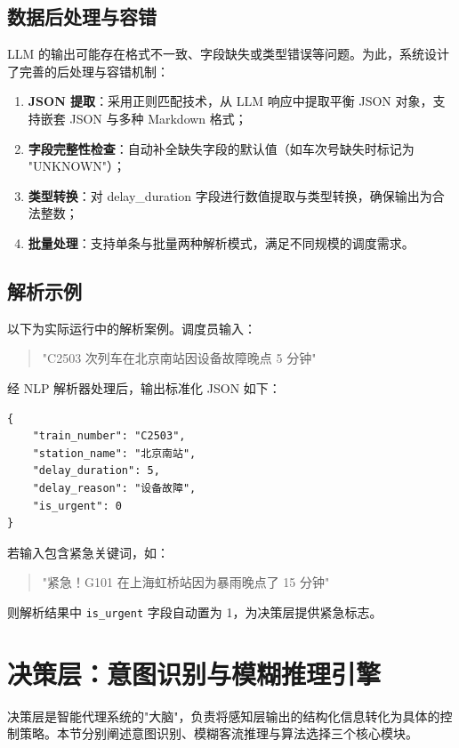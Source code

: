 \subsection{数据后处理与容错}

LLM 的输出可能存在格式不一致、字段缺失或类型错误等问题。为此，系统设计了完善的后处理与容错机制：

\begin{enumerate}
    \item \textbf{JSON 提取}：采用正则匹配技术，从 LLM 响应中提取平衡 JSON 对象，支持嵌套 JSON 与多种 Markdown 格式；
    \item \textbf{字段完整性检查}：自动补全缺失字段的默认值（如车次号缺失时标记为 "UNKNOWN"）；
    \item \textbf{类型转换}：对 delay\_duration 字段进行数值提取与类型转换，确保输出为合法整数；
    \item \textbf{批量处理}：支持单条与批量两种解析模式，满足不同规模的调度需求。
\end{enumerate}

\subsection{解析示例}

以下为实际运行中的解析案例。调度员输入：

\begin{quote}
    "C2503 次列车在北京南站因设备故障晚点 5 分钟"
\end{quote}

经 NLP 解析器处理后，输出标准化 JSON 如下：

\begin{verbatim}
{
    "train_number": "C2503",
    "station_name": "北京南站",
    "delay_duration": 5,
    "delay_reason": "设备故障",
    "is_urgent": 0
}
\end{verbatim}

若输入包含紧急关键词，如：

\begin{quote}
    "紧急！G101 在上海虹桥站因为暴雨晚点了 15 分钟"
\end{quote}

则解析结果中 \texttt{is\_urgent} 字段自动置为 1，为决策层提供紧急标志。

\section{决策层：意图识别与模糊推理引擎}
\label{agent:sec4}

决策层是智能代理系统的"大脑"，负责将感知层输出的结构化信息转化为具体的控制策略。本节分别阐述意图识别、模糊客流推理与算法选择三个核心模块。

